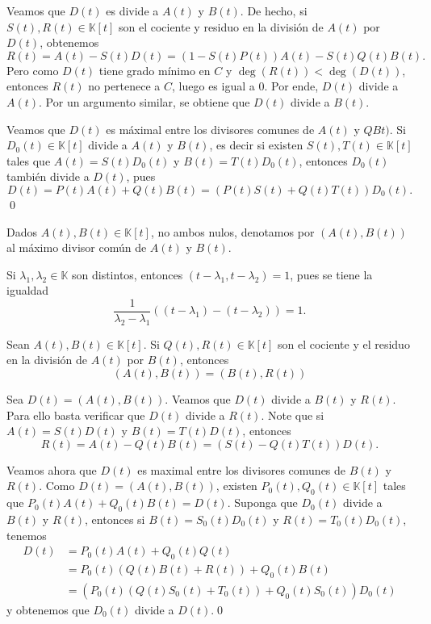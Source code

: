 Veamos que $D(t)$ es divide a $A(t)$ y $B(t)$. De hecho, si $S(t),R(t)\in \mathbb{K}[t]$ son el cociente y residuo en la división de $A(t)$ por $D(t)$, obtenemos
$$R(t)=A(t)-S(t)D(t)=\left(1-S(t)P(t)\right)A(t)-S(t)Q(t)B(t).$$
Pero como $D(t)$ tiene grado mínimo en $C$ y $\deg\left(R(t)\right)<\deg\left(D(t)\right)$, entonces $R(t)$ no pertenece a $C$, luego es igual a $0$. Por ende, $D(t)$ divide a $A(t)$. Por un argumento similar, se obtiene que $D(t)$ divide a $B(t)$.

Veamos que $D(t)$ es máximal entre los divisores comunes de $A(t)$ y $QBt)$. Si $D_0(t)\in \mathbb{K}[t]$ divide a $A(t)$ y $B(t)$, es decir si existen
$S(t),T(t)\in \mathbb{K}[t]$ tales que $A(t)=S(t)D_0(t)$ y $B(t)=T(t)D_0(t)$, entonces $D_0(t)$ también divide a $D(t)$, pues
\[
D(t)=P(t)A(t)+Q(t)B(t)=\left(P(t)S(t)+Q(t)T(t)\right)D_0(t).
\]
\qed

\begin{nota}
Dados $A(t),B(t)\in \mathbb{K}[t]$, no ambos nulos, denotamos por $\left(A(t),B(t)\right)$ al máximo divisor común de $A(t)$ y $B(t)$.
\end{nota}

\begin{ejem}
Si $\lambda_1,\lambda_2\in \mathbb{K}$ son distintos, entonces $\left(t-\lambda_1,t-\lambda_2\right)=1$, pues se tiene la igualdad
\[
\frac{1}{\lambda_2-\lambda_1}\left( (t-\lambda_1)-(t-\lambda_2) \right)=1.
\]
\end{ejem}

\begin{teo}
Sean $A(t),B(t)\in \mathbb{K}[t]$. Si $Q(t),R(t)\in \mathbb{K}[t]$ son el cociente y el residuo en la división de $A(t)$ por $B(t)$, entonces
$$\left(A(t),B(t)\right)=\left(B(t),R(t)\right) $$
\end{teo}

\dem Sea $D(t)=\left(A(t),B(t)\right)$. Veamos que $D(t)$ divide a $B(t)$ y $R(t)$. Para ello basta verificar que $D(t)$ divide a $R(t)$. Note que si $A(t)=S(t)D(t)$ y $B(t)=T(t)D(t)$, entonces $$R(t)=A(t)-Q(t)B(t)=\left(S(t)-Q(t)T(t)\right)D(t).$$

Veamos ahora que $D(t)$ es maximal entre los divisores comunes de $B(t)$ y $R(t)$. Como $D(t)=\left(A(t),B(t)\right)$, existen $P_0(t),Q_0(t)\in \mathbb{K}[t]$ tales que $P_0(t)A(t)+Q_0(t)B(t)=D(t)$.
Suponga que $D_0(t)$ divide a $B(t)$ y $R(t)$, entonces si $B(t)=S_0(t)D_0(t)$ y $R(t)=T_0(t)D_0(t)$, tenemos
\begin{align*}
D(t) & = P_0(t)A(t)+Q_0(t)Q(t)\\
 & =P_0(t)\left(Q(t)B(t)+R(t)\right)+Q_0(t)B(t)\\
 & =\left(P_0(t)\left(Q(t)S_0(t)+T_0(t)\right)+Q_0(t)S_0(t)\right)D_0(t)
\end{align*}
y obtenemos que $D_0(t)$ divide a $D(t)$.\qed

